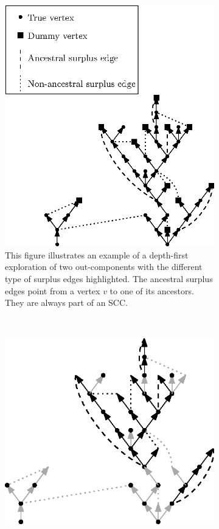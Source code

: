 \begin{figure}
\centering
\begin{subfigure}{0.8\textwidth}
 \centering
    \includegraphics[scale=1.2]{Content/Pictures/Fig7a.eps}
    \caption{This figure illustrates an example of a depth-first exploration of two out-components with the different type of surplus edges highlighted. The ancestral surplus edges point from a vertex $v$ to one of its ancestors. They are always part of an SCC.}
    \label{subfigure.typesofsurplusedges} 
\end{subfigure}\\
\begin{subfigure}{0.8\textwidth}
  \centering
  \includegraphics[scale=1.2]{Content/Pictures/Fig7b.eps}

\end{subfigure}
\end{figure}
